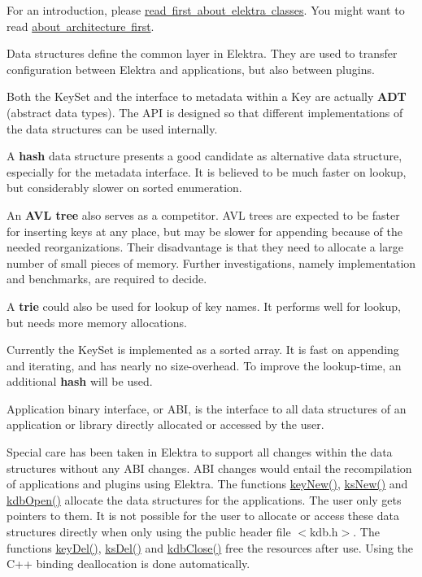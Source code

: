 For an introduction, please \mbox{\hyperlink{doc_dev_classes_md}{read first about elektra classes}}. You might want to read \mbox{\hyperlink{doc_dev_architecture_md}{about architecture first}}.

Data structures define the common layer in Elektra. They are used to transfer configuration between Elektra and applications, but also between plugins.

Both the {\ttfamily Key\+Set} and the interface to metadata within a {\ttfamily Key} are actually {\bfseries{A\+DT}} (abstract data types). The A\+PI is designed so that different implementations of the data structures can be used internally.

A {\bfseries{hash}} data structure presents a good candidate as alternative data structure, especially for the metadata interface. It is believed to be much faster on lookup, but considerably slower on sorted enumeration.

An {\bfseries{A\+VL tree}} also serves as a competitor. A\+VL trees are expected to be faster for inserting keys at any place, but may be slower for appending because of the needed reorganizations. Their disadvantage is that they need to allocate a large number of small pieces of memory. Further investigations, namely implementation and benchmarks, are required to decide.

A {\bfseries{trie}} could also be used for lookup of key names. It performs well for lookup, but needs more memory allocations.

Currently the {\ttfamily Key\+Set} is implemented as a sorted array. It is fast on appending and iterating, and has nearly no size-\/overhead. To improve the lookup-\/time, an additional {\bfseries{hash}} will be used.

Application binary interface, or A\+BI, is the interface to all data structures of an application or library directly allocated or accessed by the user.

Special care has been taken in Elektra to support all changes within the data structures without any A\+BI changes. A\+BI changes would entail the recompilation of applications and plugins using Elektra. The functions {\ttfamily \mbox{\hyperlink{group__key_gad23c65b44bf48d773759e1f9a4d43b89}{key\+New()}}}, {\ttfamily \mbox{\hyperlink{group__keyset_ga671e1aaee3ae9dc13b4834a4ddbd2c3c}{ks\+New()}}} and {\ttfamily \mbox{\hyperlink{group__kdb_ga6808defe5870f328dd17910aacbdc6ca}{kdb\+Open()}}} allocate the data structures for the applications. The user only gets pointers to them. It is not possible for the user to allocate or access these data structures directly when only using the public header file {\ttfamily $<$kdb.\+h$>$}. The functions {\ttfamily \mbox{\hyperlink{group__key_ga3df95bbc2494e3e6703ece5639be5bb1}{key\+Del()}}}, {\ttfamily \mbox{\hyperlink{group__keyset_ga27e5c16473b02a422238c8d970db7ac8}{ks\+Del()}}} and {\ttfamily \mbox{\hyperlink{group__kdb_gadb54dc9fda17ee07deb9444df745c96f}{kdb\+Close()}}} free the resources after use. Using the C++ binding deallocation is done automatically.

